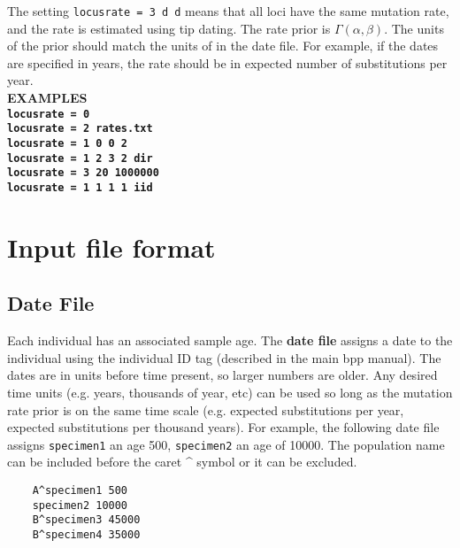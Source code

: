 \documentclass[11pt]{article}
\begin{document}
The setting \texttt{locusrate = 3 d d}  means that all loci have
the same mutation rate, and the rate is estimated using tip dating.
The rate prior is $\Gamma(\alpha, \beta)$. 
The units of the prior should match the units of in the date file. 
For example, if the dates are specified in years, the rate should be in expected number of substitutions per year.
\vspace{5pt}\\
\textbf{EXAMPLES} \vspace{5pt}\\
\textbf{\texttt{locusrate = 0}} \vspace{5pt}\\
\textbf{\texttt{locusrate = 2 rates.txt}}\vspace{5pt}\\
\textbf{\texttt{locusrate = 1 0 0 2}} \vspace{5pt}\\
\textbf{\texttt{locusrate = 1 2 3 2 dir}} \vspace{5pt}\\
\textbf{\texttt{locusrate = 3 20 1000000}}\vspace{5pt}\\
\textbf{\texttt{locusrate = 1 1 1 1 iid}} \vspace{10pt}\\


\section{Input file format}
\subsection{Date File} \label{datefile} 
Each individual has an associated sample age. 
The \textbf{date file} assigns a date to the individual using the individual ID tag (described in the main bpp manual). 
The dates are in units before time present, so larger numbers are older.
Any desired time units (e.g. years, thousands of year, etc) can be used so long as the mutation rate prior is on the same time scale (e.g. expected substitutions per year, expected substitutions per thousand years).
For example, the following date file assigns \texttt{specimen1} an age 500, \texttt{specimen2} an age of 10000. The population name can be included before the caret \^{} symbol or it can be excluded. 
\begin{verbatim}
	A^specimen1 500
	specimen2 10000
	B^specimen3 45000
	B^specimen4 35000
\end{verbatim}
\end{document}
